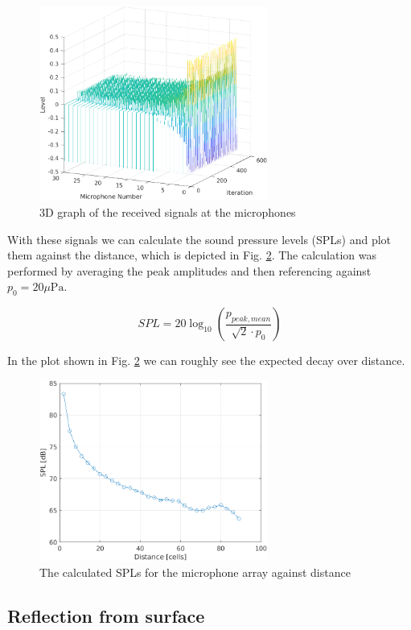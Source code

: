 \documentclass[twocolumn]{article}
\begin{document}
\begin{figure}[H]
    \centering
    \includegraphics[width=75mm]{./Images/3_1_3d.png}
    \caption{3D graph of the received signals at the microphones}
    \label{fig_3_1_3D}
\end{figure}

With these signals we can calculate the sound pressure levels (SPLs) and plot
them against the distance, which is depicted in Fig. \ref{fig_3_1_spl}.
The calculation was performed by averaging the peak amplitudes and then
referencing against $p_0 = 20\mu\text{Pa}$.

\begin{equation}
    SPL = 20\log_{10}\left(\frac{p_{peak,mean}}{\sqrt{2}\cdot p_{0}}\right)
\end{equation}

In the plot shown in Fig. \ref{fig_3_1_spl} we can roughly see the expected
decay over distance.

\begin{figure}[H]
    \centering
    \includegraphics[width=75mm]{./Images/3_1_spls.png}
    \caption{The calculated SPLs for the microphone array against distance}
    \label{fig_3_1_spl}
\end{figure}

\subsection{Reflection from surface}
\end{document}
